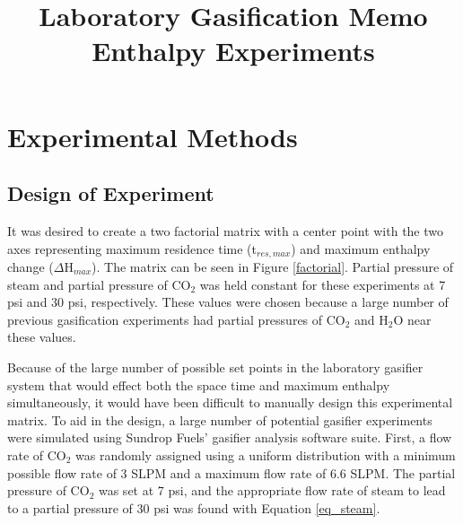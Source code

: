 \documentclass[11pt,twocolumn]{article}
\date{}
\title{Laboratory Gasification Memo\\Enthalpy Experiments \vspace{-6ex}}
\begin{document}

\section*{Experimental Methods}

\subsection*{Design of Experiment}

It was desired to create a two factorial matrix with a center point with the two axes representing maximum residence time (t$_{res,max}$) and maximum enthalpy change ($\Delta$H$_{max}$).  The matrix can be seen in Figure \ref{factorial}.  Partial pressure of steam and partial pressure of CO$_2$ was held constant for these experiments at 7 psi and 30 psi, respectively.  These values were chosen because a large number of previous gasification experiments had partial pressures of CO$_2$ and H$_2$O near these values.  

Because of the large number of possible set points in the laboratory gasifier system that would effect both the space time and maximum enthalpy simultaneously, it would have been difficult to manually design this experimental matrix.  To aid in the design, a large number of potential gasifier experiments were simulated using Sundrop Fuels' gasifier analysis software suite.  First, a flow rate of CO$_2$ was randomly assigned using a uniform distribution with a minimum possible flow rate of 3 SLPM and a maximum flow rate of 6.6 SLPM.  The partial pressure of CO$_2$ was set at 7 psi, and the appropriate flow rate of steam to lead to a partial pressure of 30 psi was found with Equation \ref{eq_steam}.
\end{document}
